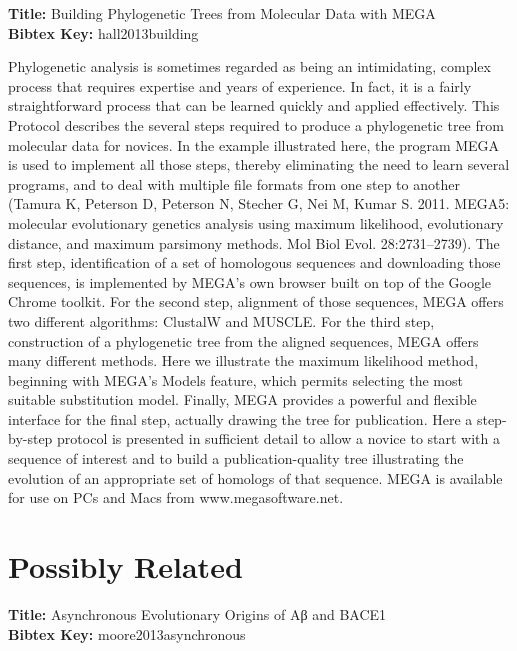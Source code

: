 \documentclass[11pt]{article}
\begin{document}
\textbf{Title: }Building Phylogenetic Trees from Molecular Data with MEGA\\
\textbf{Bibtex Key: }hall2013building\\
\cite{hall2013building}

Phylogenetic analysis is sometimes regarded as being an intimidating, complex process that requires expertise and years of experience. 
In fact, it is a fairly straightforward process that can be learned quickly and applied effectively. 
This Protocol describes the several steps required to produce a phylogenetic tree from molecular data for novices. 
In the example illustrated here, the program MEGA is used to implement all those steps, thereby eliminating the need to learn several programs, and to deal with multiple file formats from one step to another (Tamura K, Peterson D, Peterson N, Stecher G, Nei M, Kumar S. 2011. MEGA5: molecular evolutionary genetics analysis using maximum likelihood, evolutionary distance, and maximum parsimony methods. Mol Biol Evol. 28:2731–2739). 
The first step, identification of a set of homologous sequences and downloading those sequences, is implemented by MEGA's own browser built on top of the Google Chrome toolkit. 
For the second step, alignment of those sequences, MEGA offers two different algorithms: ClustalW and MUSCLE. 
For the third step, construction of a phylogenetic tree from the aligned sequences, MEGA offers many different methods. 
Here we illustrate the maximum likelihood method, beginning with MEGA's Models feature, which permits selecting the most suitable substitution model. 
Finally, MEGA provides a powerful and flexible interface for the final step, actually drawing the tree for publication. 
Here a step-by-step protocol is presented in sufficient detail to allow a novice to start with a sequence of interest and to build a publication-quality tree illustrating the evolution of an appropriate set of homologs of that sequence. 
MEGA is available for use on PCs and Macs from www.megasoftware.net.

\section{Possibly Related}

\textbf{Title: }Asynchronous Evolutionary Origins of Aβ and BACE1\\
\textbf{Bibtex Key: }moore2013asynchronous\\
\cite{moore2013asynchronous}
\end{document}
